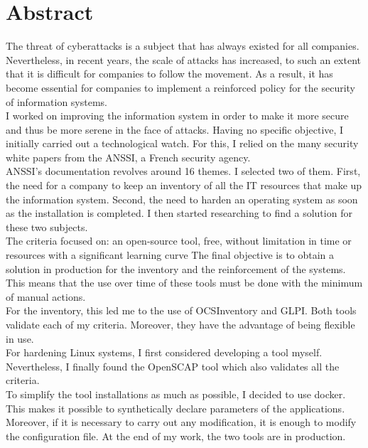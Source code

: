 \documentclass[12pt, a4paper, twoside]{article}
\begin{document}
\newpage
\section*{Abstract}
The threat of cyberattacks is a subject that has always existed for all companies.
Nevertheless, in recent years, the scale of attacks has increased, to such an extent that it is difficult for companies to follow the movement.
As a result, it has become essential for companies to implement a reinforced policy for the security of information systems. \\

I worked on improving the information system in order to make it more secure and thus be more serene in the face of attacks.
Having no specific objective, I initially carried out a technological watch. 
For this, I relied on the many security white papers from the \gls{ANSSI}, a French security agency. \\

\gls{ANSSI}'s documentation revolves around 16 themes. 
I selected two of them.
First, the need for a company to keep an inventory of all the IT resources that make up the information system. 
Second, the need to harden an operating system as soon as the installation is completed.
I then started researching to find a solution for these two subjects. \\

The criteria focused on: an open-source tool, free, without limitation in time or resources with a significant learning curve
The final objective is to obtain a solution in production for the inventory and the reinforcement of the systems. 
This means that the use over time of these tools must be done with the minimum of manual actions. \\

For the inventory, this led me to the use of \gls{OCSInventory} and \gls{GLPI}. 
Both tools validate each of my criteria. 
Moreover, they have the advantage of being flexible in use. \\

For hardening Linux systems, I first considered developing a tool myself. 
Nevertheless, I finally found the OpenSCAP tool which also validates all the criteria. \\

To simplify the tool installations as much as possible, I decided to use docker.
This makes it possible to synthetically declare parameters of the applications. 
Moreover, if it is necessary to carry out any modification, it is enough to modify the configuration file. 
At the end of my work, the two tools are in production. \\
\end{document}
